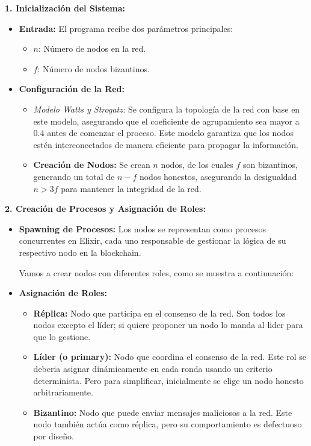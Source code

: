 {\large{
    \textbf{1. Inicialización del Sistema:}
    \begin{itemize}
        \item \textbf{Entrada:} El programa recibe dos parámetros principales:
        \begin{itemize}
            \item $n$: Número de nodos en la red.
            \item $f$: Número de nodos bizantinos.
        \end{itemize}
        \item \textbf{Configuración de la Red:}
        \begin{itemize}
            \item \textit{Modelo Watts y Strogatz:} Se configura la topología de la red con base en este modelo, asegurando que el coeficiente de agrupamiento sea mayor a 0.4 antes de comenzar el proceso. Este modelo garantiza que los nodos estén interconectados de manera eficiente para propagar la información.
            \item \textbf{Creación de Nodos:} Se crean $n$ nodos, de los cuales $f$ son bizantinos, generando un total de $n - f$ nodos honestos, asegurando la desigualdad $n > 3f$ para mantener la integridad de la red.
        \end{itemize}
    \end{itemize}

    \vspace{0.5cm}

    \textbf{2. Creación de Procesos y Asignación de Roles:}
    \begin{itemize}
        \item \textbf{Spawning de Procesos:} Los nodos se representan como procesos concurrentes en Elixir, cada uno responsable de gestionar la lógica de su respectivo nodo en la blockchain. 
        
        Vamos a crear nodos con diferentes roles, como se muestra a continuación:
        \item \textbf{Asignación de Roles:}
        \begin{itemize}
            \item \textbf{Réplica:} Nodo que participa en el consenso de la red. Son todos los nodos excepto el líder; si quiere proponer un nodo lo manda al lider para que lo gestione.
            \item \textbf{Líder (o primary):} Nodo que coordina el consenso de la red. Este rol se deberia asignar dinámicamente en cada ronda usando un criterio determinista. Pero para simplificar, inicialmente se elige un nodo honesto arbitrariamente.
            \item \textbf{Bizantino:} Nodo que puede enviar mensajes maliciosos a la red. Este nodo también actúa como réplica, pero su comportamiento es defectuoso por diseño.
        \end{itemize}


\end{itemize}}}
